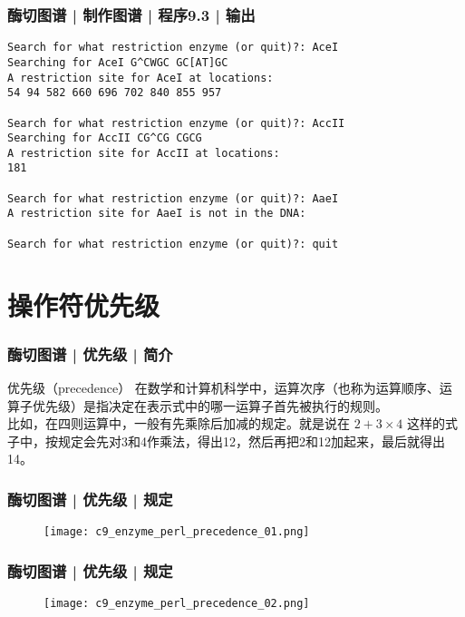 \begin{frame}[fragile]
  \frametitle{酶切图谱 | 制作图谱 | 程序9.3 | 输出}
  \vspace{-1.5em}
\begin{lstlisting}[basicstyle=\footnotesize\tt,numberstyle=\scriptsize]
Search for what restriction enzyme (or quit)?: AceI
Searching for AceI G^CWGC GC[AT]GC
A restriction site for AceI at locations:
54 94 582 660 696 702 840 855 957

Search for what restriction enzyme (or quit)?: AccII
Searching for AccII CG^CG CGCG
A restriction site for AccII at locations:
181

Search for what restriction enzyme (or quit)?: AaeI
A restriction site for AaeI is not in the DNA:

Search for what restriction enzyme (or quit)?: quit
\end{lstlisting}
\end{frame}

\section{操作符优先级}
\begin{frame}
  \frametitle{酶切图谱 | 优先级 | 简介}
  \begin{block}{优先级（precedence）}
    在数学和计算机科学中，运算次序（也称为运算顺序、运算子优先级）是指决定在表示式中的哪一运算子首先被执行的规则。\\
    \vspace{1em}
    比如，在四则运算中，一般有先乘除后加减的规定。就是说在 $2 + 3 \times 4 $ 这样的式子中，按规定会先对3和4作乘法，得出12，然后再把2和12加起来，最后就得出14。
  \end{block}
\end{frame}

\begin{frame}
  \frametitle{酶切图谱 | 优先级 | 规定}
  \begin{figure}
    \centering
    \texttt{[image: c9\_enzyme\_perl\_precedence\_01.png]}
  \end{figure}
\end{frame}

\begin{frame}
  \frametitle{酶切图谱 | 优先级 | 规定}
  \begin{figure}
    \centering
    \texttt{[image: c9\_enzyme\_perl\_precedence\_02.png]}
  \end{figure}
\end{frame}

